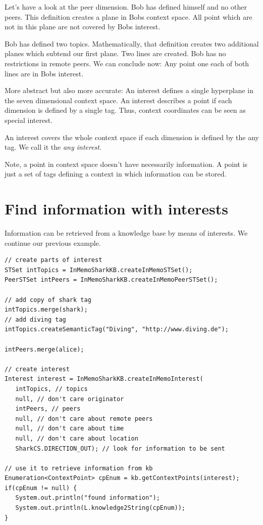 Let's have a look at the peer dimension. Bob has defined himself and no other peers. This definition creates a plane in Bobs context space. All point which are not in this plane are not covered by Bobs interest.

Bob has defined two topics. Mathematically, that definition creates two additional planes which subtend our first plane. Two lines are created. Bob has no restrictions in remote peers. We can conclude now: Any point one each of both lines are in Bobs interest. 

More abstract but also more accurate: An interest defines a single hyperplane in the seven dimensional context space. An interest describes a point if each dimension is defined by a single tag. Thus, context coordinates can be seen as special interest.

An interest covers the whole context space if each dimension is defined by the any tag. We call it the {\it any interest}.

Note, a point in context space doesn't have necessarily information. A point is just a set of tags defining a context in which information can be stored.

\section{Find information with interests}
Information can be retrieved from a knowledge base by means of interests.
We continue our previous example.

\begin{verbatim}
// create parts of interest
STSet intTopics = InMemoSharkKB.createInMemoSTSet();
PeerSTSet intPeers = InMemoSharkKB.createInMemoPeerSTSet();

// add copy of shark tag
intTopics.merge(shark);
// add diving tag
intTopics.createSemanticTag("Diving", "http://www.diving.de");

intPeers.merge(alice);

// create interest
Interest interest = InMemoSharkKB.createInMemoInterest(
   intTopics, // topics
   null, // don't care originator
   intPeers, // peers
   null, // don't care about remote peers
   null, // don't care about time
   null, // don't care about location
   SharkCS.DIRECTION_OUT); // look for information to be sent

// use it to retrieve information from kb
Enumeration<ContextPoint> cpEnum = kb.getContextPoints(interest);
if(cpEnum != null) {
   System.out.println("found information");
   System.out.println(L.knowledge2String(cpEnum));
}
\end{verbatim}

